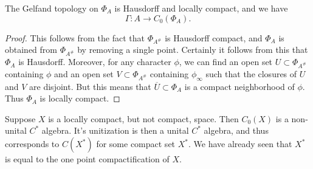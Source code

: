 \begin{theorem}
    The Gelfand topology on $\Phi_A$ is Hausdorff and locally compact, and we have
    \[ \Gamma: A \to C_0(\Phi_A). \]
\end{theorem}
\begin{proof}
    This follows from the fact that $\Phi_{A^\#}$ is Hausdorff compact, and $\Phi_A$ is obtained from $\Phi_{A^\#}$ by removing a single point. Certainly it follows from this that $\Phi_A$ is Hausdorff. Moreover, for any character $\phi$, we can find an open set $U \subset \Phi_{A^\#}$ containing $\phi$ and an open set $V \subset \Phi_{A^\#}$ containing $\phi_\infty$ such that the closures of $U$ and $V$ are disjoint. But this means that $\overline{U} \subset \Phi_A$ is a compact neighborhood of $\phi$. Thus $\Phi_A$ is locally compact.
%
%
%
\end{proof}

\begin{example}
    Suppose $X$ is a locally compact, but not compact, space. Then $C_0(X)$ is a non-unital $C^*$ algebra. It's unitization is then a unital $C^*$ algebra, and thus corresponds to $C(X^*)$ for some compact set $X^*$. We have already seen that $X^*$ is equal to the one point compactification of $X$.
\end{example}

